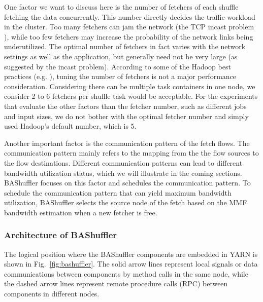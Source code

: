 \documentclass[10pt,journal,compsoc]{IEEEtran}
\begin{document}
One factor we want to discuss here is the number of fetchers of each shuffle fetching the data
concurrently.
This number directly decides the traffic workload in the cluster. Too many
fetchers can jam the network (the TCP incast problem \cite{Phanishayee:2008:MAT}),
while too few fetchers may increase the probability of the network
links being underutilized. 
The optimal number of fetchers in fact varies with the network settings as well as the application, but generally need not be very large (as suggested by the incast problem). 
According to some of the Hadoop best practices (e.g. \cite{white2015hadoop}), tuning the number of fetchers is not a major performance consideration. 
Considering there can be multiple task containers in one node, we consider 2 to 6 fetchers per shuffle task would be acceptable. 
For the experiments that evaluate the other factors than the fetcher number, such as different jobs and input sizes, we do not bother with the optimal fetcher number and simply used Hadoop's default number, which is 5. 

Another important factor is the communication pattern of the fetch
flows. 
The communication pattern mainly refers to the mapping from the the flow sources to the flow destinations.
Different communication patterns can lead to different bandwidth utilization status, which we will illustrate in the coming sections.
BAShuffler focuses on this factor and schedules the communication pattern.
To schedule the communication pattern that can yield maximum bandwidth
utilization, BAShuffler selects the source node of the fetch based on the MMF bandwidth estimation
when a new fetcher is free.


\subsubsection{Architecture of BAShuffler}
The logical position where the BAShuffler components are embedded in YARN is shown in Fig.~\ref{fig:bashuffler}. 
The solid arrow lines represent local signals or data communications
between components by method calls in the same node,
while the dashed arrow lines represent remote procedure calls (RPC)
between components in different nodes.
\end{document}
